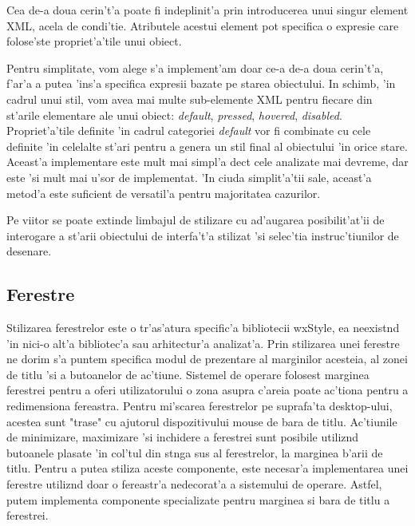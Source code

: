 Cea de-a doua cerin't'a poate fi indeplinit'a prin introducerea unui singur element XML, acela de condi'tie. Atributele acestui element pot specifica o expresie care folose'ste propriet'a'tile unui obiect.

\medskip

Pentru simplitate, vom alege s'a implement'am doar ce-a de-a doua cerin't'a, f'ar'a a putea 'ins'a specifica expresii bazate pe starea obiectului. In schimb, 'in cadrul unui stil, vom avea mai multe sub-elemente XML pentru fiecare din st'arile elementare ale unui obiect: \emph{default}, \emph{pressed}, \emph{hovered}, \emph{disabled}. Propriet'a'tile definite 'in cadrul categoriei \emph{default} vor fi combinate cu cele definite 'in celelalte st'ari pentru a genera un stil final al obiectului 'in orice stare. Aceast'a implementare este mult mai simpl'a dec{\ia}t cele analizate mai devreme, dar este 'si mult mai u'sor de implementat. 'In ciuda simplit'a'tii sale, aceast'a metod'a este suficient de versatil'a pentru majoritatea cazurilor.

\medskip

Pe viitor se poate extinde limbajul de stilizare cu ad'augarea posibilit'at'ii de interogare a st'arii obiectului de interfa't'a stilizat 'si selec'tia instruc'tiunilor de desenare.

\subsection{Ferestre}

Stilizarea ferestrelor este o tr'as'atura specific'a bibliotecii wxStyle, ea neexist{\ia}nd 'in nici-o alt'a bibliotec'a sau arhitectur'a analizat'a. Prin stilizarea unei ferestre ne dorim s'a puntem specifica modul de prezentare al marginilor acesteia, al zonei de titlu 'si a butoanelor de ac'tiune. Sistemel de operare folosest marginea ferestrei pentru a oferi utilizatorului o zona asupra c'areia poate ac'tiona pentru a redimensiona fereastra. Pentru mi'scarea ferestrelor pe suprafa'ta desktop-ului, acestea sunt "trase" cu ajutorul dispozitivului mouse de bara de titlu. Ac'tiunile de minimizare, maximizare 'si inchidere a ferestrei sunt posibile utiliz{\ia}nd butoanele plasate 'in col'tul din st{\ia}nga sus al ferestrelor, la marginea b'arii de titlu. Pentru a putea stiliza aceste componente, este necesar'a implementarea unei ferestre utiliz{\ia}nd doar o fereastr'a nedecorat'a a sistemului de operare. Astfel, putem implementa componente specializate pentru marginea si bara de titlu a ferestrei.

